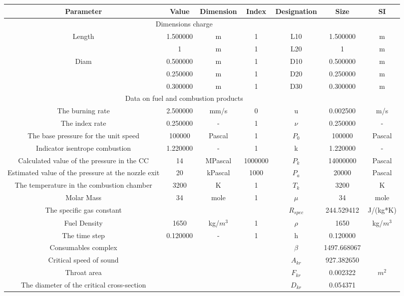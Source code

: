 \begin{center}
\begin{tabular}{  | c | c | c | c | c | c | c | }
\hline
Parameter & Value & Dimension & Index & Designation & Size & SI \\
\hline
\multicolumn{6}{|c}{Dimensions charge} & \\
\hline
Length & 1.500000 & m & 1 & L10 & 1.500000 & m \\
\hline
  & 1 & m & 1 & L20 & 1 & m \\
\hline
Diam & 0.500000 & m & 1 & D10 & 0.500000 & m \\
\hline
  & 0.250000 & m & 1 & D20 & 0.250000 & m \\
\hline
  & 0.300000 & m & 1 & D30 & 0.300000 & m \\
\hline
\multicolumn{6}{|c}{ Data on fuel and combustion products }&  \\
\hline
The burning rate & 2.500000 & mm/s & 0 & u & 0.002500 & m/s \\
\hline
The index rate & 0.250000 &  -  & 1 & $\nu$ & 0.250000 &  -  \\
\hline
The base pressure for the unit speed & 100000 & Pascal & 1 & $P_0$ & 100000 & Pascal \\
\hline
Indicator isentrope combustion & 1.220000 &  -  & 1 & k & 1.220000 &  -  \\
\hline
Calculated value of the pressure in the CC & 14 & MPascal & 1000000 & $P_k$ & 14000000 & Pascal \\
\hline
Estimated value of the pressure at the nozzle exit & 20 & kPascal & 1000 & $P_a$ & 20000 & Pascal \\
\hline
The temperature in the combustion chamber & 3200 & K & 1 & $T_k$ & 3200 & K \\
\hline
Molar Mass & 34 & mole & 1 & $\mu$ & 34 & mole \\
\hline
The specific gas constant &  &  &  & $R_{spec}$ & 244.529412 & J/(kg*K) \\
\hline
Fuel Density & 1650 & kg/$m^3$ & 1 & $\rho$ & 1650 & kg/$m^3$ \\
\hline
The time step & 0.120000 &  -  & 1 & h & 0.120000 &   \\
\hline
Consumables complex &  &  &  & $\beta$ & 1497.668067 &   \\
\hline
Critical speed of sound &  &  &  & $A_{kr}$ & 927.382650 &   \\
\hline
Throat area &  &  &  & $F_{kr}$ & 0.002322 & $m^2$ \\
\hline
The diameter of the critical cross-section &  &  &  & $D_{kr}$ & 0.054371 &   \\

\end{tabular}
\end{center}
